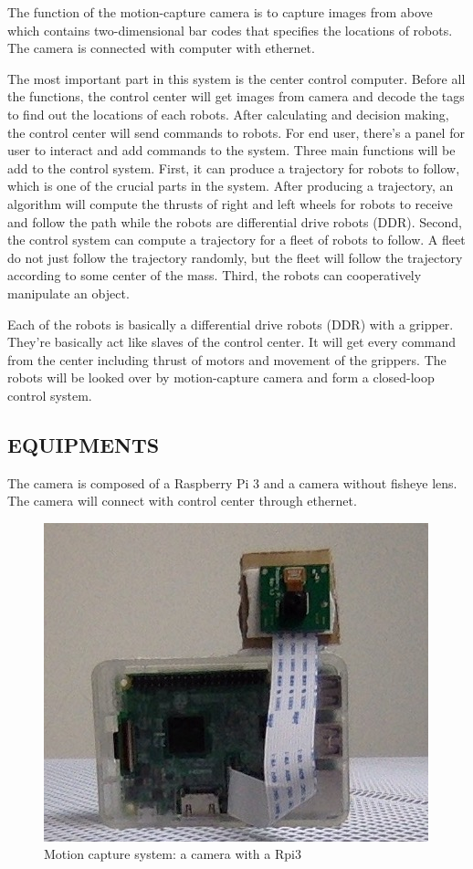\documentclass[letterpaper, 10 pt, conference]{ieeeconf}  %
\begin{document}
The function of the motion-capture camera is to capture images from above which contains two-dimensional bar codes that specifies the locations of robots.  The camera is connected with computer with ethernet.

The most important part in this system is the center control computer. Before all the functions, the control center will get images from camera and decode the tags to find out the locations of each robots. After calculating and decision making, the control center will send commands to robots. For end user, there's a panel for user to interact and add commands to the system. Three main functions will be add to the control system. First, it can produce a trajectory for robots to follow, which is one of the crucial parts in the system. After producing a trajectory, an algorithm will compute the thrusts of right and left wheels for robots to receive and follow the path while the robots are differential drive robots (DDR). Second, the control system can compute a trajectory for a fleet of robots to follow. A fleet do not just follow the trajectory randomly, but the fleet will follow the trajectory according to some center of the mass. Third, the robots can cooperatively manipulate an object.

Each of the robots is basically a differential drive robots (DDR) with a gripper. They're basically act like slaves of the control center. It will get every command from the center including thrust of motors and movement of the grippers. The robots will be looked over by motion-capture camera and form a closed-loop control system.

\subsection{EQUIPMENTS} 

The camera is composed of a Raspberry Pi 3 and a camera without fisheye lens. The camera will connect with control center through ethernet. 
\begin{figure}[h] %
\includegraphics[width=0.8\columnwidth]{mocap}
\centering
\caption{Motion capture system: a camera with a Rpi3}
 \label{figure:mocap}
\end{figure}
\end{document}
